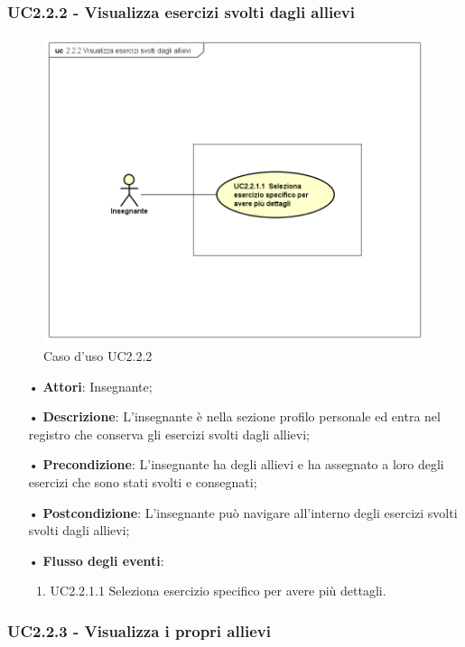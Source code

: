 \subsubsection{UC2.2.2 - Visualizza esercizi svolti dagli allievi}
\begin{figure}[H]
\centering
\includegraphics[width=17cm]{img/UC222.png} 
\caption{Caso d'uso UC2.2.2}
\end{figure}
\begin{itemize}
	\item[•] \textbf{Attori}: Insegnante;
	\item[•] \textbf{Descrizione}:  L’insegnante è nella sezione profilo personale ed entra
		nel registro che conserva gli esercizi svolti dagli allievi;
	\item[•] \textbf{Precondizione}:  L’insegnante ha degli allievi e ha assegnato a loro degli esercizi che sono stati svolti e consegnati;

	\item[•] \textbf{Postcondizione}: L’insegnante può navigare all’interno degli esercizi svolti 
                       svolti dagli allievi; 

	\item[•] \textbf{Flusso degli eventi}:
		\begin{enumerate}
			\item UC2.2.1.1  Seleziona esercizio specifico per avere più dettagli.	
		\end{enumerate}
\end{itemize}

\subsubsection{UC2.2.3 - Visualizza i propri allievi}

